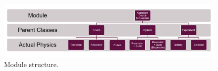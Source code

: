 \begin{figure}
    \centering
    \includegraphics{Figs/Sections/Introduction/module.png}
    \caption{Module structure.}
    \label{fig:module_overview}
\end{figure}
